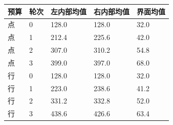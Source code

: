 \begin{tabular}{lllll}\toprule
预算 & 轮次 & 左内部均值 & 右内部均值 & 界面均值 \\ \midrule
点 & 0 & 128.0 & 128.0 & 32.0 \\
点 & 1 & 212.4 & 225.6 & 42.0 \\
点 & 2 & 307.0 & 310.2 & 54.8 \\
点 & 3 & 399.0 & 397.0 & 68.0 \\
行 & 0 & 128.0 & 128.0 & 32.0 \\
行 & 1 & 223.0 & 238.6 & 41.2 \\
行 & 2 & 331.2 & 332.8 & 52.0 \\
行 & 3 & 438.6 & 426.6 & 63.4 \\
\bottomrule\end{tabular}

